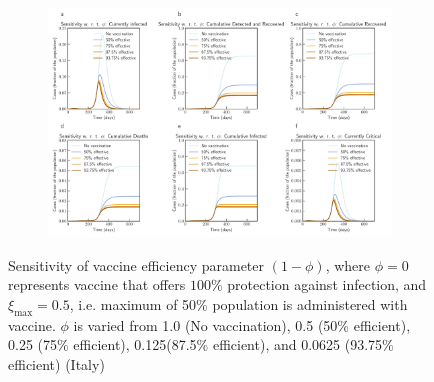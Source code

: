 \documentclass[10pt]{wlscirep}
\begin{document}
\begin{figure}[!htb]
	\centering
	\begin{subfigure}[b]{0.7\textwidth}
		\centering
		\includegraphics[width=1\linewidth]{Italy_scenario_vaccination0.5.pdf}
	\end{subfigure}
	\caption{Sensitivity of vaccine efficiency parameter $(1-\phi)$, where $\phi = 0$ represents vaccine that offers $100\%$ protection against infection, and $\xi_{\max} = 0.5$, i.e. maximum of 50\% population is administered with vaccine. $\phi$ is varied from 1.0 (No vaccination), 0.5 (50\% efficient), 0.25 (75\% efficient), 0.125(87.5\% efficient), and 0.0625 (93.75\% efficient) (Italy)}
	\label{fig5A} 
\end{figure}
\end{document}

